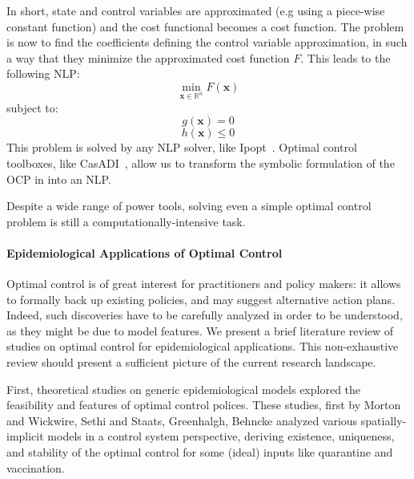 In short, state and control variables are approximated (e.g using a piece-wise constant function) and the cost functional becomes a cost function. The problem is now to find the coefficients defining the control variable approximation, in such a way that they minimize the approximated cost function $F$. This leads to the following NLP:
\begin{equation}
\min_{\textbf{x} \in \mathbb{R}^n} F(\textbf{x})
\end{equation}
subject to:
\begin{equation}
g(\textbf{x}) = 0
\end{equation}    
\begin{equation}
h(\textbf{x}) \leq 0
\end{equation}
This problem is solved by any NLP solver, like Ipopt~\cite{wachter_implementation_2006}.   Optimal control toolboxes, like CasADI~\cite{andersson_casadi:_2012}, allow us to transform the symbolic formulation of the OCP in into an NLP. 

Despite a wide range of power tools, solving even a simple  optimal control problem is still a computationally-intensive task.

\paragraph{Epidemiological Applications of Optimal Control}

Optimal control is of great interest for practitioners and policy makers: it allows to formally back up existing policies, and may suggest alternative action plans. Indeed, such discoveries have to be carefully analyzed in order to be understood, as they might be due to model features. We present a brief literature review of studies on optimal control for epidemiological applications. This non-exhaustive review should present a sufficient picture of the current research landscape.

First, theoretical studies\cite{kar_stability_2011, laguzet_global_2015} on  generic epidemiological models explored the feasibility and features of optimal control polices. These studies, first by Morton and Wickwire\cite{morton_optimal_1974}, Sethi and Staats\cite{sethi_optimal_1978}, Greenhalgh\cite{greenhalgh_results_1988}, Behncke\cite{behncke_optimal_2001} analyzed  various spatially-implicit models in a control system perspective, deriving existence, uniqueness, and stability of the optimal control for some (ideal) inputs like quarantine and vaccination.

